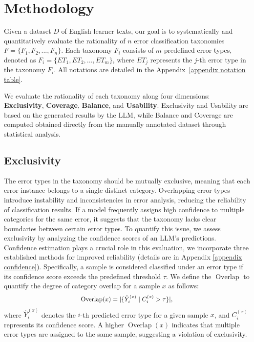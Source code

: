\section{Methodology}
Given a dataset $D$ of English learner texts, our goal is to systematically and quantitatively evaluate the rationality of $n$ error classification taxonomies $F={\{F_1, F_2,...,F_n\}}$. Each taxonomy $F_i$ consists of $m$ predefined error types, denoted as $F_i=\{ET_1, ET_2,...,ET_m\}$, where $ET_j$ represents the $j$-th error type in the taxonomy $F_i$. All notations are detailed in the Appendix~\ref{appendix notation table}.

We evaluate the rationality of each taxonomy along four dimensions: \textbf{Exclusivity}, \textbf{Coverage}, \textbf{Balance}, and \textbf{Usability}. Exclusivity and Usability are based on the generated results by the LLM, while Balance and Coverage are computed obtained directly from the manually annotated dataset through statistical analysis.

\subsection{Exclusivity}
The error types in the taxonomy should be mutually exclusive, meaning that each error instance belongs to a single distinct category. Overlapping error types introduce instability and inconsistencies in error analysis, reducing the reliability of classification results. If a model frequently assigns high confidence to multiple categories for the same error, it suggests that the taxonomy lacks clear boundaries between certain error types. To quantify this issue, we assess exclusivity by analyzing the confidence scores of an LLM’s predictions. Confidence estimation plays a crucial role in this evaluation, we incorporate three established methods \citep{confidence} for improved reliability (details are in Appendix \ref{appendix confidence}). Specifically, a sample is considered classified under an error type if its confidence score exceeds the predefined threshold $\tau$. We define the $\operatorname{Overlap}$ to quantify the degree of category overlap for a sample $x$ as follows:
\begin{equation}\begin{small}\begin{aligned}
\operatorname{Overlap}(x)=|\{\hat{Y}_i^{(x)} \mid C_i^{(x)} > \tau\}|,
\end{aligned}\end{small}\end{equation}
\noindent where $\hat{Y}_i^{(x)}$ denotes the $i$-th predicted error type for a given sample $x$, and $C_i^{(x)}$ represents its confidence score. A higher $\operatorname{Overlap}(x)$ indicates that multiple error types are assigned to the same sample, suggesting a violation of exclusivity.

